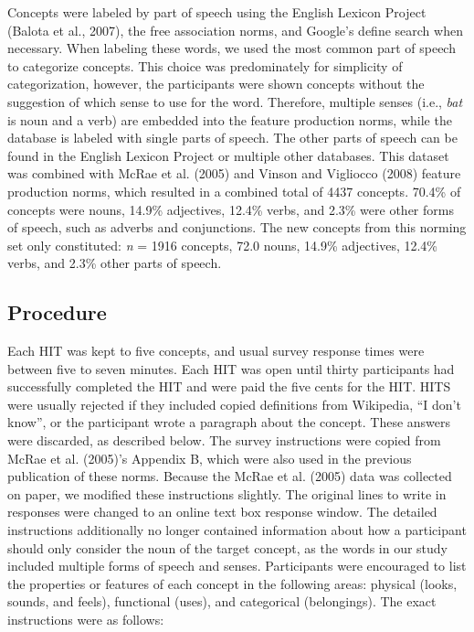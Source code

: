 \documentclass[english,,man]{apa6}
\theoremstyle{definition}
\theoremstyle{definition}
\theoremstyle{definition}
\theoremstyle{remark}
\begin{document}
Concepts were labeled by part of speech using the English Lexicon
Project (Balota et al., 2007), the free association norms, and Google's
define search when necessary. When labeling these words, we used the
most common part of speech to categorize concepts. This choice was
predominately for simplicity of categorization, however, the
participants were shown concepts without the suggestion of which sense
to use for the word. Therefore, multiple senses (i.e., \emph{bat} is
noun and a verb) are embedded into the feature production norms, while
the database is labeled with single parts of speech. The other parts of
speech can be found in the English Lexicon Project or multiple other
databases. This dataset was combined with McRae et al. (2005) and Vinson
and Vigliocco (2008) feature production norms, which resulted in a
combined total of 4437 concepts. 70.4\% of concepts were nouns, 14.9\%
adjectives, 12.4\% verbs, and 2.3\% were other forms of speech, such as
adverbs and conjunctions. The new concepts from this norming set only
constituted: \emph{n} = 1916 concepts, 72.0 nouns, 14.9\% adjectives,
12.4\% verbs, and 2.3\% other parts of speech.

\subsection{Procedure}\label{procedure}

Each HIT was kept to five concepts, and usual survey response times were
between five to seven minutes. Each HIT was open until thirty
participants had successfully completed the HIT and were paid the five
cents for the HIT. HITS were usually rejected if they included copied
definitions from Wikipedia, \enquote{I don't know}, or the participant
wrote a paragraph about the concept. These answers were discarded, as
described below. The survey instructions were copied from McRae et al.
(2005)'s Appendix B, which were also used in the previous publication of
these norms. Because the McRae et al. (2005) data was collected on
paper, we modified these instructions slightly. The original lines to
write in responses were changed to an online text box response window.
The detailed instructions additionally no longer contained information
about how a participant should only consider the noun of the target
concept, as the words in our study included multiple forms of speech and
senses. Participants were encouraged to list the properties or features
of each concept in the following areas: physical (looks, sounds, and
feels), functional (uses), and categorical (belongings). The exact
instructions were as follows:
\end{document}
